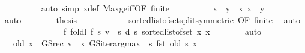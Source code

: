 \begin{isabellebody}
\ \ \ \ \ \ \ \ \isamarkupfalse%
\ {\isacharparenleft}{\kern0pt}auto\ simp{\isacharcolon}{\kern0pt}\ x{\isacharprime}{\kern0pt}{\isacharunderscore}{\kern0pt}def\ Max{\isacharunderscore}{\kern0pt}ge{\isacharunderscore}{\kern0pt}iff{\isacharbrackleft}{\kern0pt}OF\ finite\ {\isacharasterisk}{\kern0pt}{\isacharbrackright}{\kern0pt}{\isacharparenright}{\kern0pt}\isanewline
\ \ \ \ \ \ \isamarkupfalse%
\ {}{\isacharcolon}{\kern0pt}\ {\isachardoublequoteopen}{\isacharbraceleft}{\kern0pt}x{\isacharbraceright}{\kern0pt}\ {\isacharequal}{\kern0pt}\ {\isacharbraceleft}{\kern0pt}y\ {\isasymin}\ {\isacharbraceleft}{\kern0pt}{\isachardot}{\kern0pt}{\isachardot}{\kern0pt}x{\isacharbraceright}{\kern0pt}{\isachardot}{\kern0pt}\ x\ {\isasymle}\ y{\isacharbraceright}{\kern0pt}{\isachardoublequoteclose}\isanewline
\ \ \ \ \ \ \ \ \isamarkupfalse%
\ auto\isanewline
\ \ \ \ \ \ \isamarkupfalse%
\ {\isacharquery}{\kern0pt}thesis\isanewline
\ \ \ \ \ \ \ \ \isamarkupfalse%
\ {}\ {}\ sorted{\isacharunderscore}{\kern0pt}list{\isacharunderscore}{\kern0pt}of{\isacharunderscore}{\kern0pt}set{\isacharunderscore}{\kern0pt}split{\isacharbrackleft}{\kern0pt}symmetric{\isacharcomma}{\kern0pt}\ OF\ finite{\isacharbrackright}{\kern0pt}\ \isamarkupfalse%
\ auto\isanewline
\ \ \ \ \isamarkupfalse%
\isanewline
\ \ \ \ \isamarkupfalse%
\ \isamarkupfalse%
\ {\isachardoublequoteopen}{\isasymdots}\ \ {\isacharequal}{\kern0pt}\ {\isacharquery}{\kern0pt}f\ {\isacharparenleft}{\kern0pt}foldl\ {\isacharquery}{\kern0pt}f\ {\isacharparenleft}{\kern0pt}{\isasymlambda}s{\isachardot}{\kern0pt}\ {\isacharparenleft}{\kern0pt}v\ {\isachardollar}{\kern0pt}\ s{\isacharcomma}{\kern0pt}\ d\ s{\isacharparenright}{\kern0pt}{\isacharparenright}{\kern0pt}\ {\isacharparenleft}{\kern0pt}sorted{\isacharunderscore}{\kern0pt}list{\isacharunderscore}{\kern0pt}of{\isacharunderscore}{\kern0pt}set\ {\isacharbraceleft}{\kern0pt}{\isachardot}{\kern0pt}{\isachardot}{\kern0pt}x{\isacharprime}{\kern0pt}{\isacharbraceright}{\kern0pt}{\isacharparenright}{\kern0pt}{\isacharparenright}{\kern0pt}\ x{\isachardoublequoteclose}\isanewline
\ \ \ \ \ \ \isamarkupfalse%
\ auto\isanewline
\ \ \ \ \isamarkupfalse%
\ \isamarkupfalse%
\ {\isachardoublequoteopen}{\isasymdots}\ {\isacharequal}{\kern0pt}\ {\isacharparenleft}{\kern0pt}{\isacharquery}{\kern0pt}old\ {\isacharparenleft}{\kern0pt}x\ {\isacharcolon}{\kern0pt}{\isacharequal}{\kern0pt}\ {\isacharparenleft}{\kern0pt}GS{\isacharunderscore}{\kern0pt}rec\ v\ {\isachardollar}{\kern0pt}\ x{\isacharcomma}{\kern0pt}\ GS{\isacharunderscore}{\kern0pt}iter{\isacharunderscore}{\kern0pt}arg{\isacharunderscore}{\kern0pt}max\ {\isacharparenleft}{\kern0pt}{\isasymchi}\ s{\isachardot}{\kern0pt}\ fst\ {\isacharparenleft}{\kern0pt}{\isacharquery}{\kern0pt}old\ s{\isacharparenright}{\kern0pt}{\isacharparenright}{\kern0pt}\ x{\isacharparenright}{\kern0pt}{\isacharparenright}{\kern0pt}{\isacharparenright}{\kern0pt}{\isachardoublequoteclose}\isanewline

\end{isabellebody}
